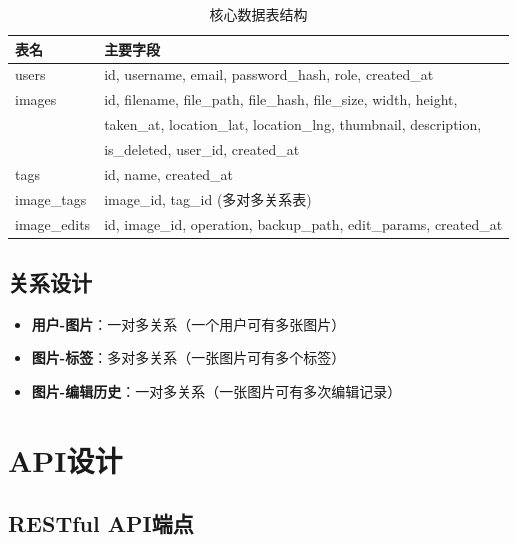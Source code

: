 \documentclass[12pt,a4paper]{article}
\begin{document}
\begin{table}[h]
\centering
\caption{核心数据表结构}
\begin{tabularx}{\textwidth}{|l|X|}
\hline
\textbf{表名} & \textbf{主要字段} \\
\hline
users & id, username, email, password\_hash, role, created\_at \\
\hline
images & id, filename, file\_path, file\_hash, file\_size, width, height, \\
 & taken\_at, location\_lat, location\_lng, thumbnail, description, \\
 & is\_deleted, user\_id, created\_at \\
\hline
tags & id, name, created\_at \\
\hline
image\_tags & image\_id, tag\_id (多对多关系表) \\
\hline
image\_edits & id, image\_id, operation, backup\_path, edit\_params, created\_at \\
\hline
\end{tabularx}
\end{table}

\subsection{关系设计}
\begin{itemize}
    \item \textbf{用户-图片}：一对多关系（一个用户可有多张图片）
    \item \textbf{图片-标签}：多对多关系（一张图片可有多个标签）
    \item \textbf{图片-编辑历史}：一对多关系（一张图片可有多次编辑记录）
\end{itemize}

\section{API设计}

\subsection{RESTful API端点}
\end{document}

